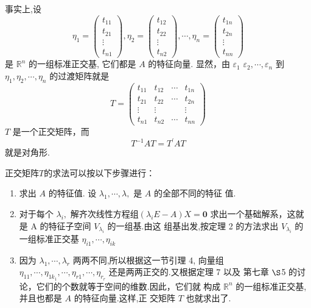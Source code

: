 \documentclass[13pt]{beamer}
\def\Rn{\mathbb{R}^n}
\begin{document}
\begin{frame}


事实上,设
\[
\eta_{1}=\left(\begin{array}{c}
t_{11} \\
t_{21} \\
\vdots \\
t_{n 1}
\end{array}\right), \eta_{2}=\left(\begin{array}{c}
t_{12} \\
t_{22} \\
\vdots \\
t_{n 2}
\end{array}\right), \cdots, \eta_{n}=\left(\begin{array}{c}
t_{1 n} \\
t_{2 n} \\
\vdots \\
t_{n n}
\end{array}\right)
\]
是 $\Rn$ 的一组标准正交基, 它们都是 $A$ 的特征向量.
显然，由 ${\varepsilon}_{1}$
${\varepsilon}_{2}, \cdots, {\varepsilon}_{n}$ 到 ${\eta}_{1}, {\eta}_{2}, \cdots, {\eta}_{n}$ 的\alert{过渡矩阵}就是
\[
{T}=\left(\begin{array}{cccc}
t_{11} & t_{12} & \cdots & t_{1 n} \\
t_{21} & t_{22} & \cdots & t_{2 n} \\
\vdots & \vdots & & \vdots \\
t_{n 1} & t_{n 2} & \cdots & t_{n n}
\end{array}\right)
\]
$T$ 是一个正交矩阵，而
\[
{T}^{-1} {A} {T}={T}^{\prime} {A} {T}
\]
就是对角形.
\end{frame}

\begin{frame}
正交矩阵$T$的求法可以按以下步骤进行：



\begin{enumerate}
	\item 求出 $A$ 的特征值. 设 $\lambda_{1}, \cdots, \lambda,$ 是 ${A}$ 的全部不同的特征
	值. 
	\item 对于每个 $\lambda_{i},$ 解齐次线性方程组$\left(\lambda_{i} {E}-{A}\right)X=\mathbf{0}$
	求出一个基础解系，这就是 A 的特征子空间 $V_{\lambda_{i}}$ 的一组基.由这 组基出发,按定理 2 的方法求出 $V_{\lambda_{i}}$ 的一组标准正交基 ${\eta}_{i 1}, \cdots,{\eta}_{i k}$
	\item 因为 $\lambda_{1}, \cdots, \lambda_{r}$ 两两不同,所以根据这一节引理 4, 向量组
	${\eta}_{11}, \cdots, {\eta}_{1 k_{1}}, \cdots, {\eta}_{r 1}, \cdots, {\eta}_{r_{r}}$ 还是两两正交的.又根据定理 7 以及
	第七章 $\S$5 的讨论，它们的个数就等于空间的维数.因此，它们就 构成 $\Rn$ 的一组标准正交基,并且也都是 $A$ 的特征向量.这样,正 交矩阵 $T$ 也就求出了. 
\end{enumerate}
\end{frame}
\end{document}
